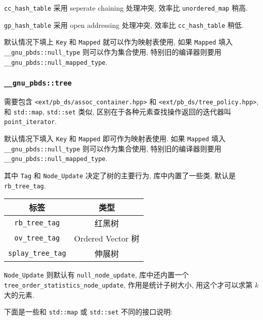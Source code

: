 \lstinline{cc_hash_table} 采用 seperate chaining 处理冲突, 效率比 \lstinline{unordered_map} 稍高.

\lstinline{gp_hash_table} 采用 open addressing 处理冲突, 效率比 \lstinline{cc_hash_table} 稍低.



默认情况下填上 \lstinline{Key} 和 \lstinline{Mapped} 就可以作为映射表使用, 如果 \lstinline{Mapped} 填入 \lstinline{__gnu_pbds::null_type} 则可以作为集合使用, 特别旧的编译器则要用 \lstinline{__gnu_pbds::null_mapped_type}.

\subsubsection{\lstinline[basicstyle=\mono]{__gnu_pbds::tree}}
需要包含 \lstinline{<ext/pb_ds/assoc_container.hpp>} 和 \lstinline{<ext/pb_ds/tree_policy.hpp>}, 和 \lstinline{std::map}, \lstinline{std::set} 类似, 区别在于各种元素查找操作返回的迭代器叫 \lstinline{point_iterator}.



默认情况下填入 \lstinline{Key} 和 \lstinline{Mapped} 即可作为映射表使用. 如果 \lstinline{Mapped} 填入 \lstinline{__gnu_pbds::null_type} 则可以作为集合使用, 特别旧的编译器则要用 \lstinline{__gnu_pbds::null_mapped_type}.

其中 \lstinline{Tag} 和 \lstinline{Node_Update} 决定了树的主要行为, 库中内置了一些类, 默认是 \lstinline{rb_tree_tag}.

\begin{center}
  \begin{tabular}{cc}
    \toprule
    \textbf{标签} & \textbf{类型} \\
    \toprule
    \lstinline|rb_tree_tag| & 红黑树 \\
    \midrule
    \lstinline|ov_tree_tag| & Ordered Vector 树 \\
    \midrule
    \lstinline|splay_tree_tag| & 伸展树 \\
    \bottomrule
  \end{tabular}
\end{center}

\lstinline{Node_Update} 则默认有 \lstinline{null_node_update}, 库中还内置一个 \lstinline{tree_order_statistics_node_update}, 作用是统计子树大小, 用这个才可以求第 $k$ 大的元素.

下面是一些和 \lstinline{std::map} 或 \lstinline{std::set} 不同的接口说明:


